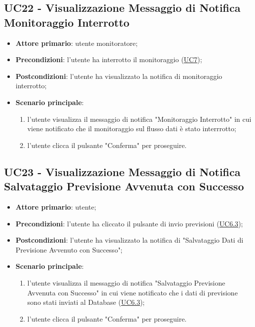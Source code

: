
	\label{par:UC22}
	\subsection{UC22 - Visualizzazione Messaggio di Notifica Monitoraggio Interrotto}
		\begin{itemize}
			\item\textbf{Attore primario}: utente monitoratore;
			\item\textbf{Precondizioni}: l’utente ha interrotto il monitoraggio (\hyperref[par:UC7]{UC7});
			\item\textbf{Postcondizioni}: l’utente ha visualizzato la notifica di monitoraggio interrotto;
			\item\textbf{Scenario principale}: 
				\begin{enumerate} 
					\item l’utente visualizza il messaggio di notifica "Monitoraggio Interrotto" in cui viene notificato che il monitoraggio sul flusso dati è stato interrrotto;
					\item l'utente clicca il pulsante "Conferma" per proseguire.		
				\end{enumerate}		
		\end{itemize}


		
	\label{par:UC23}
	\subsection{UC23 - Visualizzazione Messaggio di Notifica Salvataggio Previsione Avvenuta con Successo}	\begin{itemize}
			\item\textbf{Attore primario}: utente;
			\item\textbf{Precondizioni}: l'utente ha cliccato il pulsante di invio previsioni (\hyperref[par:UC6.3]{UC6.3});
			\item\textbf{Postcondizioni}: l'utente ha visualizzato la notifica di "Salvataggio Dati di Previsione Avvenuto con Successo"; 
			\item\textbf{Scenario principale}: 
				\begin{enumerate} 
					\item l’utente visualizza il messaggio di notifica "Salvataggio Previsione Avvenuta con Successo" in cui viene notificato che i dati di previsione sono stati inviati al Database (\hyperref[par:UC6.3]{UC6.3});
					\item l'utente clicca il pulsante "Conferma" per proseguire.		
				\end{enumerate}		
		\end{itemize}

